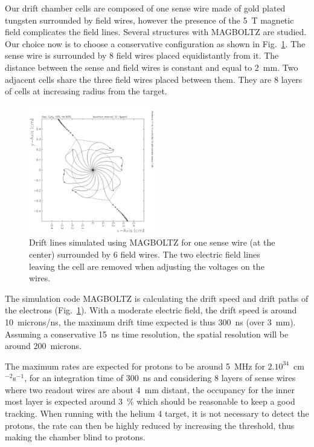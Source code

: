Our drift chamber cells are composed of one sense wire made of gold plated tungsten surrounded by field wires, however the presence of the 5~T magnetic field complicates the field lines. Several structures with MAGBOLTZ \cite{Magboltz} are studied. Our choice now is to choose a conservative configuration as shown in Fig.~\ref{fig:drift_cell}. The sense wire is surrounded by 8 field wires placed equidistantly from it. The distance between the sense and field wires is constant and equal to 2~mm. Two adjacent cells share the three field wires placed between them. They are 8 layers of cells at increasing radius from the target. \\

\begin{figure}
  \begin{center}
    \includegraphics[angle=0, width=0.5\textwidth]{./../Detector/fig-chap2/HEISOE.pdf}
    \caption{Drift lines simulated using MAGBOLTZ \cite{Magboltz} for one sense wire (at the center) surrounded by 6 field wires. The two electric field lines leaving the cell are removed when adjusting the voltages on the wires.}
    \label{fig:drift_cell}
  \end{center}
\end{figure}

The simulation code MAGBOLTZ is calculating the drift speed and drift paths of the electrons (Fig.~\ref{fig:drift_cell}). With a moderate electric field, the drift speed is around 10~microns/ns, the maximum drift time expected is thus 300~ns (over 3~mm). Assuming a conservative 15~ns time resolution, the spatial resolution will be around 200~microns. 

The maximum rates are expected for protons to be around 5~MHz for $2.10^{34}$~cm$^{-2}$s$^{-1}$, for an integration time of 300~ns and considering 8 layers of sense wires where two readout wires are about 4~mm distant, the occupancy for the inner most layer is expected around 3~\% which should be reasonable to keep a good tracking. When running with the helium 4 target, it is not necessary to detect the protons, the rate can then be highly reduced by increasing the threshold, thus making the chamber blind to protons. \\

